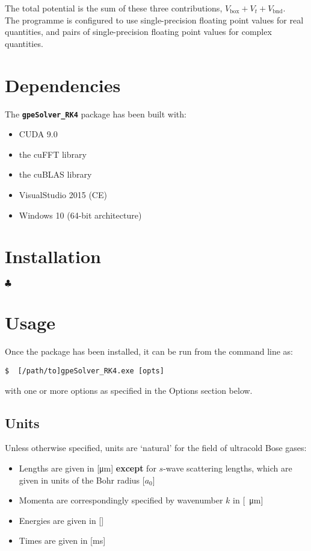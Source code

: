 \documentclass{jakedoc}
\let\oldtexttt\texttt
\renewcommand\texttt[1]{\textbf{\oldtexttt{#1}}}
\newcommand\cs{\textcolor[rgb]{0.6,0.1,0}{\ensuremath{\clubsuit}\xspace}}
\begin{document}
The total potential is the sum of these three contributions, $V_{\text{box}}+V_t+V_{\text{bnd}}$.\\

The programme is configured to use single-precision floating point values for real quantities, and pairs of single-precision floating point values for complex quantities.

\section{Dependencies}

The \texttt{gpeSolver\_RK4} package has been built with:
\begin{itemize}
\item CUDA 9.0
\item the cuFFT library
\item the cuBLAS library
\item VisualStudio 2015 (CE)
\item Windows 10 (64-bit architecture)
\end{itemize}

\section{Installation}

\cs

\section{Usage}

Once the package has been installed, it can be run from the command line as:
\begin{lstlisting}
$  [/path/to]gpeSolver_RK4.exe [opts]
\end{lstlisting}
with one or more options as specified in the Options section below.

\subsection{Units}
Unless otherwise specified, units are `natural' for the field of ultracold Bose gases:
\begin{itemize}
\item Lengths are given in [\si{\um}] \textbf{except} for $s$-wave scattering lengths, which are given in units of the Bohr radius [$a_0$]
\item Momenta are correspondingly specified by wavenumber $k$ in [\si{\per\um}]
\item Energies are given in [\si{\nK}]
\item Times are given in [\si{\milli\second}]
\end{itemize}
\end{document}

